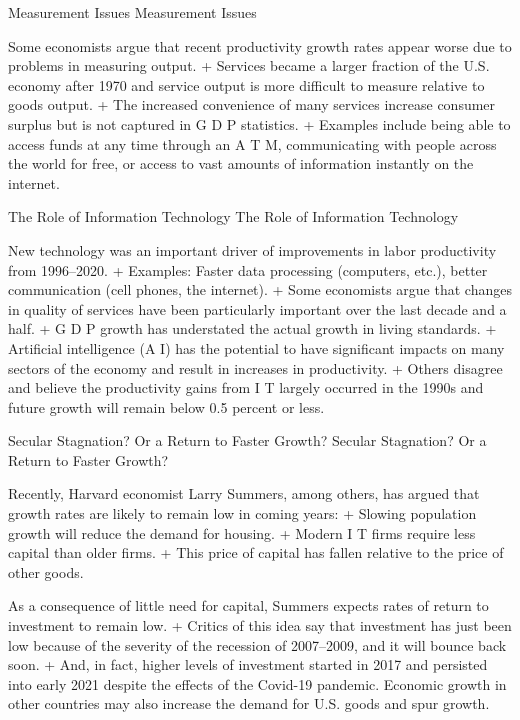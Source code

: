 \documentclass[
  12pt,
  ignorenonframetext,
]{beamer}
\begin{document}
\begin{frame}{Measurement Issues}
\protect\hypertarget{measurement-issues}{}
Measurement Issues

Some economists argue that recent productivity growth rates appear worse
due to problems in measuring output. + Services became a larger fraction
of the U.S. economy after 1970 and service output is more difficult to
measure relative to goods output. + The increased convenience of many
services increase consumer surplus but is not captured in G D P
statistics. + Examples include being able to access funds at any time
through an A T M, communicating with people across the world for free,
or access to vast amounts of information instantly on the internet.
\end{frame}

\begin{frame}{The Role of Information Technology}
\protect\hypertarget{the-role-of-information-technology}{}
The Role of Information Technology

New technology was an important driver of improvements in labor
productivity from 1996--2020. + Examples: Faster data processing
(computers, etc.), better communication (cell phones, the internet). +
Some economists argue that changes in quality of services have been
particularly important over the last decade and a half. + G D P growth
has understated the actual growth in living standards. + Artificial
intelligence (A I) has the potential to have significant impacts on many
sectors of the economy and result in increases in productivity. + Others
disagree and believe the productivity gains from I T largely occurred in
the 1990s and future growth will remain below 0.5 percent or less.
\end{frame}

\begin{frame}{Secular Stagnation? Or a Return to Faster Growth?}
\protect\hypertarget{secular-stagnation-or-a-return-to-faster-growth}{}
Secular Stagnation? Or a Return to Faster Growth?

Recently, Harvard economist Larry Summers, among others, has argued that
growth rates are likely to remain low in coming years: + Slowing
population growth will reduce the demand for housing. + Modern I T firms
require less capital than older firms. + This price of capital has
fallen relative to the price of other goods.

As a consequence of little need for capital, Summers expects rates of
return to investment to remain low. + Critics of this idea say that
investment has just been low because of the severity of the recession of
2007--2009, and it will bounce back soon. + And, in fact, higher levels
of investment started in 2017 and persisted into early 2021 despite the
effects of the Covid-19 pandemic. Economic growth in other countries may
also increase the demand for U.S. goods and spur growth.
\end{frame}
\end{document}
